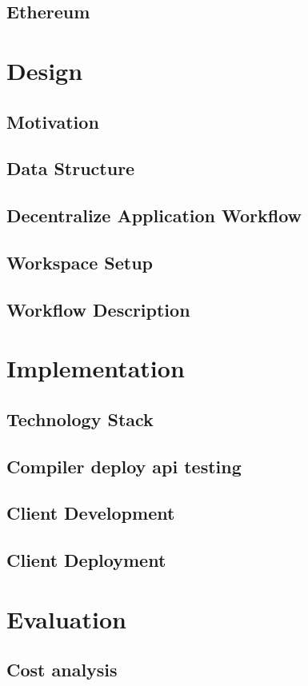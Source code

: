 \documentclass [12pt]{article}
\begin{document}
\subsection{Ethereum}
\section{Design}
\subsection{Motivation}
\subsection{Data Structure}
\subsection{Decentralize Application Workflow }
\subsection{Workspace Setup}
\subsection{Workflow Description}
\section{Implementation}
\subsection{Technology Stack}
\subsection{Compiler deploy api testing}
\subsection{Client Development}
\subsection{Client Deployment}
\section{Evaluation}
\subsection{Cost analysis}
\end{document}
